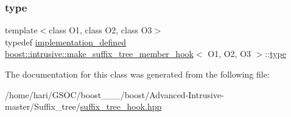 \mbox{\label{classboost_1_1intrusive_1_1make__suffix__tree__member__hook_ad60aeb75c91f8af7d26f667cecb0b8d9}} 
\subsubsection{\texorpdfstring{type}{type}}
{\footnotesize\ttfamily template$<$class O1, class O2, class O3$>$ \\
typedef \hyperlink{classboost_1_1intrusive_1_1make__suffix__tree__member__hook_a933f8ac391dbd99a5f61386b58a04d60}{implementation\+\_\+defined} \hyperlink{classboost_1_1intrusive_1_1make__suffix__tree__member__hook}{boost\+::intrusive\+::make\+\_\+suffix\+\_\+tree\+\_\+member\+\_\+hook}$<$ O1, O2, O3 $>$\+::\hyperlink{classboost_1_1intrusive_1_1make__suffix__tree__member__hook_ad60aeb75c91f8af7d26f667cecb0b8d9}{type}}



The documentation for this class was generated from the following file\+:\begin{DoxyCompactItemize}
\item 
/home/hari/\+G\+S\+O\+C/boost\+\_\+\_\+\_/boost/\+Advanced-\/\+Intrusive-\/master/\+Suffix\+\_\+tree/\hyperlink{suffix__tree__hook_8hpp}{suffix\+\_\+tree\+\_\+hook.\+hpp}\end{DoxyCompactItemize}
